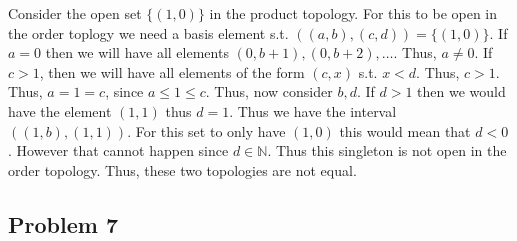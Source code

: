 \documentclass[12pt, letterpaper]{article}
\theoremstyle{definition}
\newcommand{\N}{\mathbb{N}}
\begin{document}
\begin{enumerate}[(a)]
    Consider the open set $\{(1,0)\}$ in the product topology. For this to be open in the order toplogy we need a basis element s.t. $((a,b),(c,d))=\{(1,0)\}$. If $a=0$ then we will have all elements $(0,b+1),(0,b+2),\dots$. Thus, $a \neq 0$. If $c>1$, then we will have all elements of the form $(c,x)$ s.t. $x < d$. Thus, $c > 1$. Thus, $a=1=c$, since $a \leq 1 \leq c$. Thus, now consider $b,d$. If $d>1$ then we would have the element $(1,1)$ thus $d=1$. Thus we have the interval $((1,b),(1,1))$. For this set to only have $(1,0)$ this would mean that $d<0$. However that cannot happen since $d \in \N$. Thus this singleton is not open in the order topology. Thus, these two topologies are not equal.
\end{enumerate}

\newpage
\subsection*{Problem 7}
\end{document}
